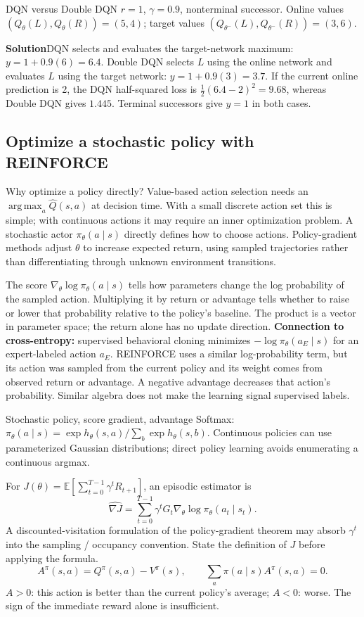 \documentclass[10pt,a4paper]{article}
\newcommand{\ans}{\par\smallskip\textbf{\color{good}Solution\quad}}
\newcommand{\E}{\mathbb E}
\newcommand{\argmax}{\operatorname*{arg\,max}}
\begin{document}
\begin{question}{DQN versus Double DQN}
$r=1$, $\gamma=0.9$, nonterminal successor. Online values $(Q_\theta(L),Q_\theta(R))=(5,4)$; target values $(Q_{\theta^-}(L),Q_{\theta^-}(R))=(3,6)$.
\ans DQN selects and evaluates the target-network maximum: $y=1+0.9(6)=6.4$. Double DQN selects $L$ using the online network and evaluates $L$ using the target network: $y=1+0.9(3)=3.7$. If the current online prediction is 2, the DQN half-squared loss is $\tfrac12(6.4-2)^2=9.68$, whereas Double DQN gives $1.445$. Terminal successors give $y=1$ in both cases.
\end{question}

\subsection{Optimize a stochastic policy with REINFORCE}
\begin{card}{Why optimize a policy directly?}
Value-based action selection needs an $\argmax_a\hat Q(s,a)$ at decision time. With a small discrete action set this is simple; with continuous actions it may require an inner optimization problem. A stochastic actor $\pi_\theta(a\mid s)$ directly defines how to choose actions. Policy-gradient methods adjust $\theta$ to increase expected return, using sampled trajectories rather than differentiating through unknown environment transitions.

The score $\nabla_\theta\log\pi_\theta(a\mid s)$ tells how parameters change the log probability of the sampled action. Multiplying it by return or advantage tells whether to raise or lower that probability relative to the policy's baseline. The product is a vector in parameter space; the return alone has no update direction.
\textbf{Connection to cross-entropy:} supervised behavioral cloning minimizes $-\log\pi_\theta(a_E\mid s)$ for an expert-labeled action $a_E$. REINFORCE uses a similar log-probability term, but its action was sampled from the current policy and its weight comes from observed return or advantage. A negative advantage decreases that action's probability. Similar algebra does not make the learning signal supervised labels.
\end{card}
\begin{card}{Stochastic policy, score gradient, advantage}
Softmax: $\pi_\theta(a\mid s)=\exp h_\theta(s,a)/\sum_b\exp h_\theta(s,b)$. Continuous policies can use parameterized Gaussian distributions; direct policy learning avoids enumerating a continuous argmax.

For $J(\theta)=\E[\sum_{t=0}^{T-1}\gamma^tR_{t+1}]$, an episodic estimator is
\[
\widehat{\nabla J}=\sum_{t=0}^{T-1}\gamma^tG_t\nabla_\theta\log\pi_\theta(a_t\mid s_t).
\]
A discounted-visitation formulation of the policy-gradient theorem may absorb $\gamma^t$ into the sampling / occupancy convention. State the definition of $J$ before applying the formula.
\[
A^\pi(s,a)=Q^\pi(s,a)-V^\pi(s),\qquad
\sum_a\pi(a\mid s)A^\pi(s,a)=0.
\]
$A>0$: this action is better than the current policy's average; $A<0$: worse. The sign of the immediate reward alone is insufficient.
\end{card}
\end{document}
